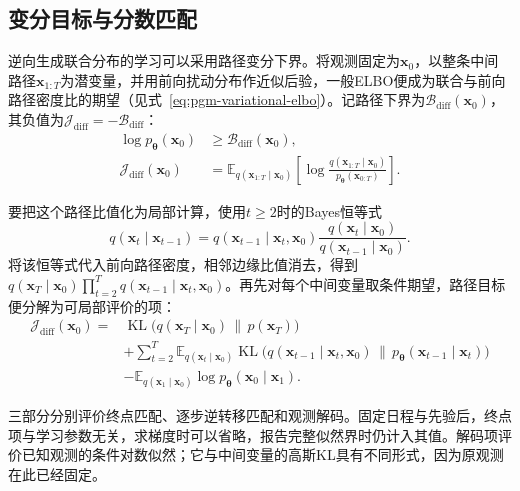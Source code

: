 \subsection{变分目标与分数匹配}
\label{sec:pgm-generative-diffusion-objective}

逆向生成联合分布的学习可以采用路径变分下界。将观测固定为$\bm{x}_0$，以整条中间路径$\bm{x}_{1:T}$为潜变量，并用前向扰动分布作近似后验，一般ELBO便成为联合与前向路径密度比的期望（见式~\eqref{eq:pgm-variational-elbo}）。记路径下界为$\mathcal{B}_{\mathrm{diff}}(\bm{x}_0)$，其负值为$\mathcal{J}_{\mathrm{diff}}=-\mathcal{B}_{\mathrm{diff}}$：
\begin{equation}
  \label{eq:pgm-generative-path-elbo}
  \begin{aligned}
    \log p_{\bm{\theta}}(\bm{x}_0)
      &\geq\mathcal{B}_{\mathrm{diff}}(\bm{x}_0),\\
    \mathcal{J}_{\mathrm{diff}}(\bm{x}_0)
      &=\mathbb{E}_{q(\bm{x}_{1:T}\mid\bm{x}_0)}
         \left[\log
           \frac{q(\bm{x}_{1:T}\mid\bm{x}_0)}
                {p_{\bm{\theta}}(\bm{x}_{0:T})}
         \right].
  \end{aligned}
\end{equation}

要把这个路径比值化为局部计算，使用$t\geq2$时的Bayes恒等式
\[
  q(\bm{x}_t\mid\bm{x}_{t-1})
  =q(\bm{x}_{t-1}\mid\bm{x}_t,\bm{x}_0)
     \frac{q(\bm{x}_t\mid\bm{x}_0)}
          {q(\bm{x}_{t-1}\mid\bm{x}_0)}.
\]
将该恒等式代入前向路径密度，相邻边缘比值消去，得到$q(\bm{x}_T\mid\bm{x}_0)\prod_{t=2}^{T}q(\bm{x}_{t-1}\mid\bm{x}_t,\bm{x}_0)$。再先对每个中间变量取条件期望，路径目标便分解为可局部评价的项：
\begin{equation}
  \label{eq:pgm-generative-ddpm-kl}
  \begin{aligned}
    \mathcal{J}_{\mathrm{diff}}(\bm{x}_0)
      ={}&\operatorname{KL}\bigl(
          q(\bm{x}_T\mid\bm{x}_0)\,\|\,p(\bm{x}_T)\bigr)\\
       &+\sum_{t=2}^{T}
         \mathbb{E}_{q(\bm{x}_t\mid\bm{x}_0)}
          \operatorname{KL}\bigl(
           q(\bm{x}_{t-1}\mid\bm{x}_t,\bm{x}_0)
           \,\|\,p_{\bm{\theta}}(\bm{x}_{t-1}\mid\bm{x}_t)
                         \bigr)\\
       &-\mathbb{E}_{q(\bm{x}_1\mid\bm{x}_0)}
          \log p_{\bm{\theta}}(\bm{x}_0\mid\bm{x}_1).
  \end{aligned}
\end{equation}

三部分分别评价终点匹配、逐步逆转移匹配和观测解码。固定日程与先验后，终点项与学习参数无关，求梯度时可以省略，报告完整似然界时仍计入其值。解码项评价已知观测的条件对数似然；它与中间变量的高斯KL具有不同形式，因为原观测在此已经固定。

